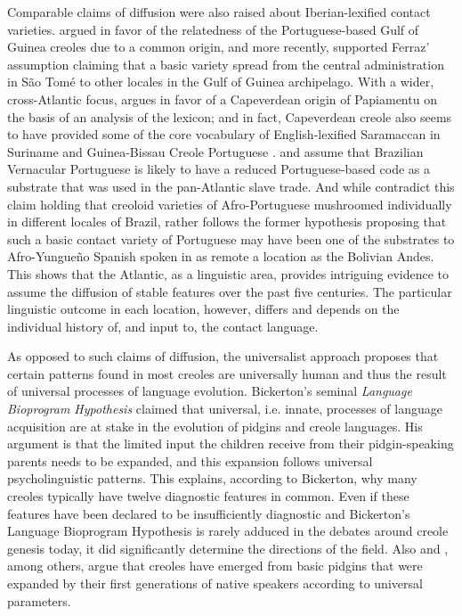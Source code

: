 \documentclass[output=paper]{langscibook}
\begin{document}
Comparable claims of diffusion were also raised about Iberian-lexified contact varieties. \textcite{ferraz1987portuguese} argued in favor of the relatedness of the Portuguese-based Gulf of Guinea creoles due to a common origin, and more recently, \citet{hagemeijer2011gulf} supported Ferraz’ assumption claiming that a basic variety spread from the central administration in São Tomé to other locales in the Gulf of Guinea archipelago. With a wider, cross-Atlantic focus, \citet{jacobs2009upper} argues in favor of a Capeverdean origin of Papiamentu on the basis of an analysis of the lexicon; and in fact, Capeverdean creole also seems to have provided some of the core vocabulary of English-lexified Saramaccan in Suriname and Guinea-Bissau Creole Portuguese \citep{jacobsetal2016relevance}. \citet{mello1996genesis} and \citet[29]{lipski2005history} assume that Brazilian Vernacular Portuguese is likely to have a reduced Portuguese-based code as a substrate that was used in the pan-Atlantic slave trade. And while \citet{lucchesietal2009portugues} contradict this claim holding that creoloid varieties of Afro-Portuguese mushroomed individually in different locales of Brazil, \citet{perez2015traces} rather follows the former hypothesis proposing that such a basic contact variety of Portuguese may have been one of the substrates to Afro-Yungueño Spanish spoken in as remote a location as the Bolivian Andes. This shows that the Atlantic, as a linguistic area, provides intriguing evidence to assume the diffusion of stable features over the past five centuries. The particular linguistic outcome in each location, however, differs and depends on the individual history of, and input to, the contact language.

As opposed to such claims of diffusion, the universalist approach proposes that certain patterns found in most creoles are universally human and thus the result of universal processes of language evolution. Bickerton’s \parencite*{bickerton1981roots} seminal \emph{Language Bioprogram Hypothesis} claimed that universal, i.e. innate, processes of language acquisition are at stake in the evolution of pidgins and creole languages. His argument is that the limited input the children receive from their pidgin-speaking parents needs to be expanded, and this expansion follows universal psycholinguistic patterns. This explains, according to Bickerton, why many creoles typically have twelve diagnostic features in common. Even if these features have been declared to be insufficiently diagnostic and Bickerton’s Language Bioprogram Hypothesis is rarely adduced in the debates around creole genesis today, it did significantly determine the directions of the field. Also \citet{mcworther1995sisters} and \citet{parkvall2000out}, among others, argue that creoles have emerged from basic pidgins that were expanded by their first generations of native speakers according to universal parameters.
\end{document}
